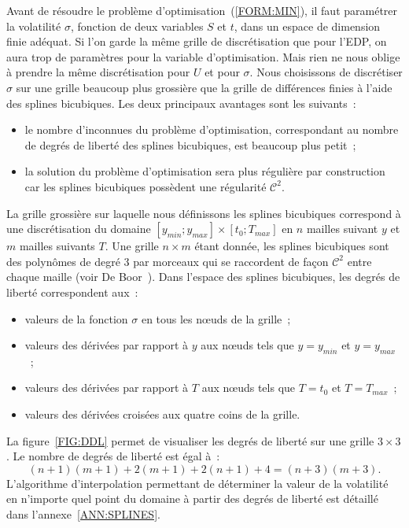 Avant de r\'esoudre le probl\`eme d'optimisation~(\ref{FORM:MIN}), 
il faut param\'etrer la volatilit\'e $\sigma$, fonction de deux 
variables $S$ et $t$, dans un espace de dimension finie 
ad\'equat. Si l'on garde la m\^eme grille de discr\'etisation 
que pour l'EDP, on aura trop de param\`etres pour la variable 
d'optimisation. Mais rien ne nous oblige \`a prendre la m\^eme 
discr\'etisation pour $U$ et pour $\sigma$. Nous choisissons 
de discr\'etiser $\sigma$ sur une grille beaucoup plus 
grossi\`ere que la grille de diff\'erences finies \`a l'aide 
des splines bicubiques. Les deux principaux avantages sont les 
suivants~:
\begin{itemize}
\item le nombre d'inconnues du probl\`eme d'optimisation, 
correspondant au nombre de degr\'es de libert\'e des splines 
bicubiques, est beaucoup plus petit~;
\item la solution du probl\`eme d'optimisation sera plus 
r\'eguli\`ere par construction car les splines bicubiques 
poss\`edent une r\'egularit\'e $\mathcal{C}^2$.
\end{itemize}
La grille grossi\`ere sur laquelle nous d\'efinissons les 
splines bicubiques correspond \`a une discr\'etisation du 
domaine $[y_{min};y_{max}] \times [t_0;T_{max}]$ en 
$n$ mailles suivant $y$ et $m$ mailles suivants $T$. Une 
grille $n \times m$ \'etant donn\'ee, les splines bicubiques 
sont des polyn\^omes de degr\'e $3$ par morceaux qui se 
raccordent de fa\c con $\mathcal{C}^2$ entre chaque maille 
(voir De Boor~\cite{deb:jmp:62}). Dans l'espace des splines 
bicubiques, les degr\'es de libert\'e correspondent aux~:
\begin{itemize}
\item valeurs de la fonction $\sigma$ en tous les n{\oe}uds de 
la grille~;
\item valeurs des d\'eriv\'ees par rapport \`a $y$ aux 
n{\oe}uds tels que $y = y_{min}$ et $y = y_{max}$~;
\item valeurs des d\'eriv\'ees par rapport \`a $T$ aux 
n{\oe}uds tels que $T = t_0$ et $T = T_{max}$~;
\item valeurs des d\'eriv\'ees crois\'ees aux quatre coins de la 
grille.
\end{itemize}
La figure~\ref{FIG:DDL} permet de visualiser les degr\'es de 
libert\'e sur une grille $3 \times 3$. Le nombre de degr\'es de 
libert\'e est \'egal \`a~: 
$$
(n+1)(m+1) + 2(m+1) + 2(n+1) + 4 = (n+3)(m+3).
$$
L'algorithme d'interpolation permettant de d\'eterminer la 
valeur de la volatilit\'e en n'importe quel point du domaine 
\`a partir des degr\'es de libert\'e est d\'etaill\'e dans 
l'annexe~\ref{ANN:SPLINES}.

